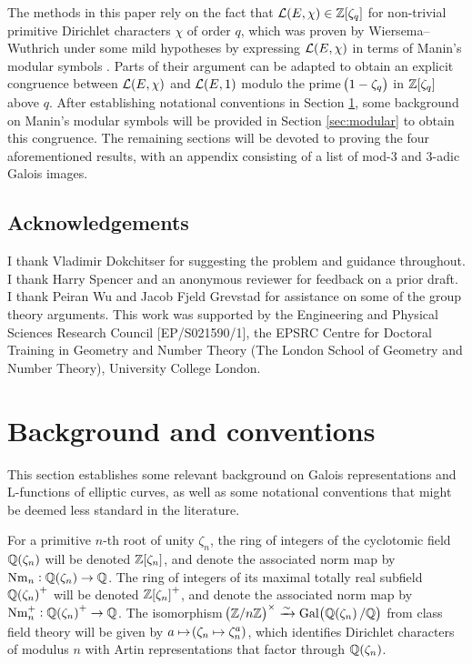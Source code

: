 \documentclass{article}
\theoremstyle{plain}
\theoremstyle{definition}
\newcommand{\Gal}{\operatorname{Gal}}
\newcommand{\LLL}{\mathcal{L}}
\newcommand{\Nm}{\operatorname{Nm}}
\newcommand{\QQ}{\mathbb{Q}}
\newcommand{\ZZ}{\mathbb{Z}}
\newcommand{\br}{\!\del}
\begin{document}
The methods in this paper rely on the fact that $ \LLL\br{E, \chi} \in \ZZ\sbr[0]{\zeta_q} $ for non-trivial primitive Dirichlet characters $ \chi $ of order $ q $, which was proven by Wiersema--Wuthrich under some mild hypotheses by expressing $ \LLL\br{E, \chi} $ in terms of Manin's modular symbols \cite[Theorem 2]{WW22}. Parts of their argument can be adapted to obtain an explicit congruence between $ \LLL\br{E, \chi} $ and $ \LLL\br{E, 1} $ modulo the prime $ \br{1 - \zeta_q} $ in $ \ZZ\sbr[0]{\zeta_q} $ above $ q $. After establishing notational conventions in Section \ref{sec:background}, some background on Manin's modular symbols will be provided in Section \ref{sec:modular} to obtain this congruence. The remaining sections will be devoted to proving the four aforementioned results, with an appendix consisting of a list of mod-$ 3 $ and $ 3 $-adic Galois images.

\subsection*{Acknowledgements}

I thank Vladimir Dokchitser for suggesting the problem and guidance throughout. I thank Harry Spencer and an anonymous reviewer for feedback on a prior draft. I thank Peiran Wu and Jacob Fjeld Grevstad for assistance on some of the group theory arguments. This work was supported by the Engineering and Physical Sciences Research Council [EP/S021590/1], the EPSRC Centre for Doctoral Training in Geometry and Number Theory (The London School of Geometry and Number Theory), University College London.

\pagebreak

\section{Background and conventions}

\label{sec:background}

This section establishes some relevant background on Galois representations and L-functions of elliptic curves, as well as some notational conventions that might be deemed less standard in the literature.

For a primitive $ n $-th root of unity $ \zeta_n $, the ring of integers of the cyclotomic field $ \QQ\br{\zeta_n} $ will be denoted $ \ZZ\sbr{\zeta_n} $, and denote the associated norm map by $ \Nm_n : \QQ\br{\zeta_n} \to \QQ $. The ring of integers of its maximal totally real subfield $ \QQ\br{\zeta_n}^+ $ will be denoted $ \ZZ\sbr{\zeta_n}^+ $, and denote the associated norm map by $ \Nm_n^+ : \QQ\br{\zeta_n}^+ \to \QQ $. The isomorphism $ \br{\ZZ / n\ZZ}^\times \xrightarrow{\sim} \Gal\br[1]{\QQ\br{\zeta_n} / \QQ} $ from class field theory will be given by $ a \mapsto \br{\zeta_n \mapsto \zeta_n^a} $, which identifies Dirichlet characters of modulus $ n $ with Artin representations that factor through $ \QQ\br{\zeta_n} $.
\end{document}
